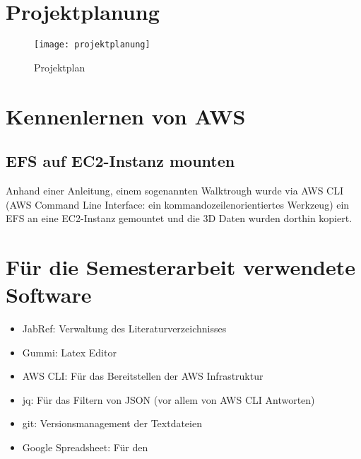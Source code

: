 \section{Projektplanung}
\begin{figure}[H]
	\centering
	\texttt{[image: projektplanung]}
	\caption{Projektplan}
	\label{fig:Projektplan}
\end{figure}

\section{Kennenlernen von AWS}

\subsection{EFS auf EC2-Instanz mounten}
Anhand einer Anleitung, einem sogenannten Walktrough wurde via AWS CLI (AWS Command Line Interface: ein kommandozeilenorientiertes Werkzeug) ein
EFS an eine EC2-Instanz gemountet und die 3D Daten wurden dorthin kopiert.

\section{Für die Semesterarbeit verwendete Software}
\begin{itemize}
\item JabRef: Verwaltung des Literaturverzeichnisses
\item Gummi: Latex Editor
\item AWS CLI: Für das Bereitstellen der AWS Infrastruktur
\item jq: Für das Filtern von JSON (vor allem von AWS CLI Antworten)
\item git: Versionsmanagement der Textdateien
\item Google Spreadsheet: Für den 
\end{itemize}